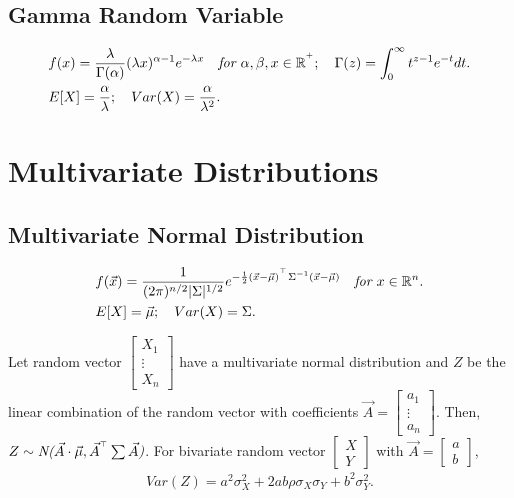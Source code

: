 \documentclass{article}
\begin{document}
\subsection{Gamma Random Variable}
\begin{align}
    & f(x) = \frac{\lambda}{\Gamma(\alpha)} (\lambda x)^{\alpha-1} e^{-\lambda x} \quad \emph{for $\alpha, \beta, x\in \mathbb{R}^{^+}$}; \quad \Gamma(z) = \int_0^\infty t^{z-1}e^{-t}dt. \nonumber \\
    & E[X] = \frac{\alpha}{\lambda}; \quad Var(X) = \frac{\alpha}{\lambda^2}. \nonumber
\end{align}

\newpage
\section{Multivariate Distributions}
\subsection{Multivariate Normal Distribution}
\begin{align}
    & f(\vec{x}) = \frac{1}{(2\pi)^{n/2}|\Sigma|^{1/2}} e^{-\frac{1}{2}(\vec{x}-\vec{\mu})^{^\top}\Sigma^{-1}(\vec{x}-\vec{\mu})} \quad \emph{for $x\in \mathbb{R}^n$}. \nonumber \\
    & E[X] = \vec{\mu}; \quad Var(X) = \Sigma. \nonumber
\end{align}

Let random vector $\begin{bmatrix} X_1 \\ \vdots \\ X_n \end{bmatrix}$ have a multivariate normal distribution and $Z$ be the linear combination of the random vector with coefficients $\vec{A} = \begin{bmatrix}
    a_1 \\ 
    \vdots \\
    a_n
\end{bmatrix}$.
Then, $Z\sim \emph{N($\vec{A}\cdot \vec{\mu},\vec{A}^{^\top}\sum\vec{A}$)}$.
For bivariate random vector $\begin{bmatrix}
    X \\ Y
\end{bmatrix}$ with $\vec{A} = \begin{bmatrix}
    a \\ b
\end{bmatrix}$,
\begin{align}
    Var(Z) = a^2\sigma_X^2+2ab\rho\sigma_X\sigma_Y+b^2\sigma_Y^2. \nonumber
\end{align}
\end{document}
